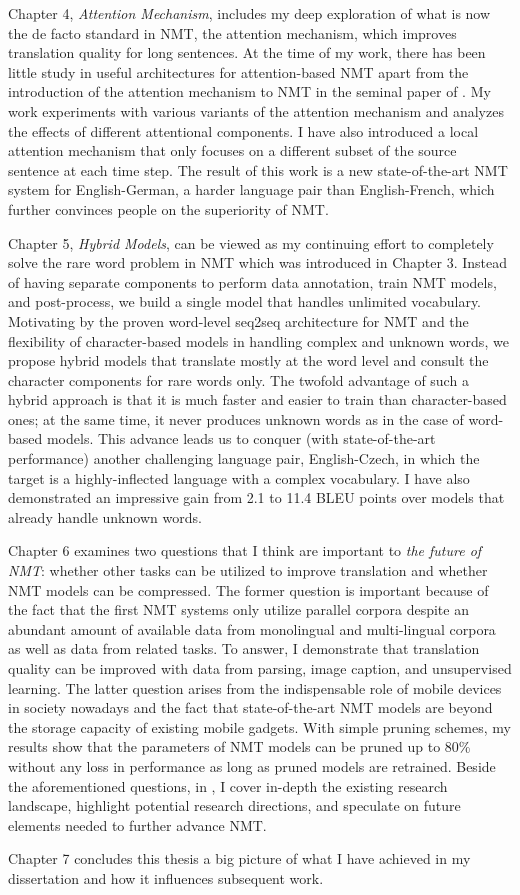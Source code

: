 Chapter 4, {\it Attention Mechanism}, includes my deep exploration of what is now the de facto standard in NMT, the attention mechanism, which improves translation quality for long sentences. At the time of my work, there has been little study in useful architectures for attention-based NMT apart from the introduction of the attention mechanism to NMT in the seminal paper of . My work experiments with various variants of the attention mechanism and analyzes the effects of different attentional components. I have also introduced a local attention mechanism that only focuses on a different subset of the source sentence at each time step. The result of this work is a new state-of-the-art NMT system for English-German, a harder language pair than English-French, which further convinces people on the superiority of NMT.

Chapter 5, {\it Hybrid Models}, can be viewed as my continuing effort to completely solve the rare word problem in NMT which was introduced in Chapter 3.
Instead of having separate components to perform data annotation, train NMT models, and post-process, we build a single model that handles unlimited vocabulary. Motivating by the proven word-level seq2seq architecture for NMT and the flexibility of character-based models in handling complex and unknown words, we propose hybrid models that translate mostly at the word level and consult the character components for rare words only. The twofold advantage of such a hybrid approach is that it is much faster and easier to train than character-based ones; at the same time, it never produces unknown words as in the case of word-based models. This advance leads us to conquer (with state-of-the-art performance) another challenging language pair, English-Czech, in which the target is a highly-inflected language with a complex vocabulary. I have also demonstrated an impressive gain from 2.1 to 11.4 BLEU points over models that already handle unknown words.

Chapter 6 examines two questions that I think are important to {\it the future of NMT}: whether other tasks can be utilized to improve translation and whether NMT models can be compressed. The former question is important because of the fact that the first NMT systems only utilize parallel corpora despite an abundant amount of available data from monolingual and multi-lingual corpora as well as data from related tasks. To answer, 
I demonstrate that translation quality can be improved with data from parsing, image caption, and unsupervised learning.
 The latter question arises from the indispensable role of mobile devices in society nowadays and the fact that state-of-the-art NMT models are beyond the storage capacity of existing mobile gadgets. With simple pruning schemes, my results show that the parameters of NMT models can be pruned up to 80\% without any loss in performance as long as pruned models are retrained. Beside the aforementioned questions, in , I cover in-depth the existing research landscape, highlight potential research directions, and speculate on future elements needed to further advance NMT.

Chapter 7 concludes this thesis a big picture of what I have achieved in my dissertation and how it influences subsequent work.
